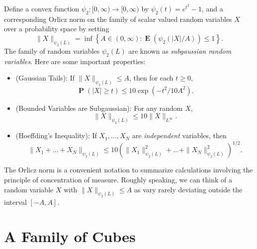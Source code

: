 \documentclass[12pt,reqno]{article}
\numberwithin{equation}{section}
\DeclareMathOperator{\EE}{\mathbf{E}}
\DeclareMathOperator{\PP}{\mathbf{P}}
\newcommand{\psitwo}[1]{\| {#1} \|_{\psi_2(L)}}
\begin{document}
Define a convex function $\psi_2: [0,\infty) \to [0,\infty)$ by $\psi_2(t) = e^{t^2} - 1$, and a corresponding Orlicz norm on the family of scalar valued random variables $X$ over a probability space by setting
%
\[ \psitwo{X} = \inf \left\{ A \in (0,\infty) : \EE(\psi_2(|X|/A)) \leq 1 \right\}. \]
%
The family of random variables $\psi_2(L)$ are known as \emph{subgaussian random variables}. Here are some important properties:
%
\begin{itemize}
	\item (Gaussian Tails): If $\psitwo{X} \leq A$, then for each $t \geq 0$,
	\[ \PP \left( |X| \geq t \right) \leq 10 \exp \left( -t^2/10A^2 \right). \]

	\item (Bounded Variables are Subgaussian): For any random $X$,
	\[ \psitwo{X} \leq 10 \| X \|_{L^\infty}. \]

	
	
	\item (Hoeffding's Inequality): If $X_1, \dots, X_N$ are \emph{independent} variables, then
	\[ \psitwo{X_1 + \dots + X_N} \leq 10 \left( \psitwo{X_1}^2 + \dots + \psitwo{X_N}^2 \right)^{1/2}. \]
\end{itemize}
%
The Orlicz norm is a convenient notation to summarize calculations involving the principle of concentration of measure. Roughly speaking, we can think of a random variable $X$ with $\psitwo{X} \leq A$ as vary rarely deviating outside the interval $[-A,A]$.

\section{A Family of Cubes}
\end{document}

